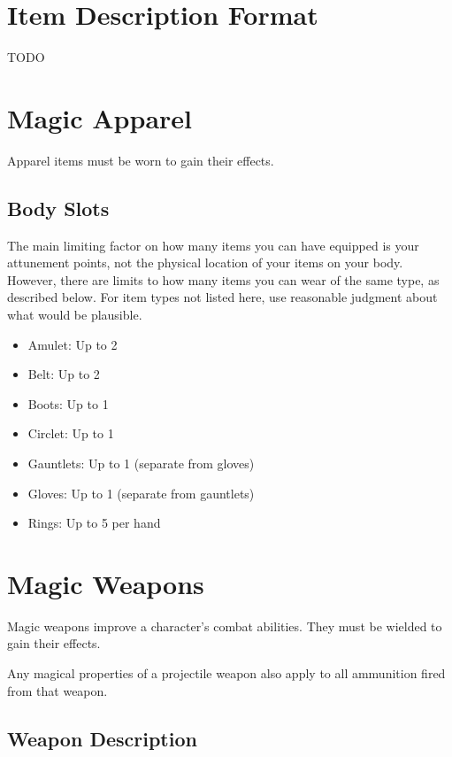 \section{Item Description Format}
    TODO

\section{Magic Apparel}
    Apparel items must be worn to gain their effects.

    \subsection{Body Slots}
        The main limiting factor on how many items you can have equipped is your attunement points, not the physical location of your items on your body.
        However, there are limits to how many items you can wear of the same type, as described below.
        For item types not listed here, use reasonable judgment about what would be plausible.
        \begin{itemize}
            \item Amulet: Up to 2
            \item Belt: Up to 2
            \item Boots: Up to 1
            \item Circlet: Up to 1
            \item Gauntlets: Up to 1 (separate from gloves)
            \item Gloves: Up to 1 (separate from gauntlets)
            \item Rings: Up to 5 per hand
        \end{itemize}

    

    

\section{Magic Weapons} %
    Magic weapons improve a character's combat abilities.
    They must be wielded to gain their effects.

     Any magical properties of a projectile weapon also apply to all ammunition fired from that weapon.

    \subsection{Weapon Description}

